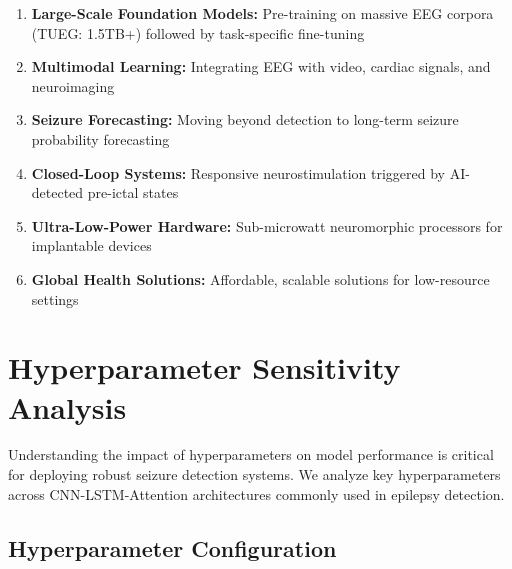 \documentclass[12pt,a4paper]{article}
\begin{document}
\begin{enumerate}
    \item \textbf{Large-Scale Foundation Models:} Pre-training on massive EEG corpora (TUEG: 1.5TB+) followed by task-specific fine-tuning
    \item \textbf{Multimodal Learning:} Integrating EEG with video, cardiac signals, and neuroimaging
    \item \textbf{Seizure Forecasting:} Moving beyond detection to long-term seizure probability forecasting
    \item \textbf{Closed-Loop Systems:} Responsive neurostimulation triggered by AI-detected pre-ictal states
    \item \textbf{Ultra-Low-Power Hardware:} Sub-microwatt neuromorphic processors for implantable devices
    \item \textbf{Global Health Solutions:} Affordable, scalable solutions for low-resource settings
\end{enumerate}

\section{Hyperparameter Sensitivity Analysis}

Understanding the impact of hyperparameters on model performance is critical for deploying robust seizure detection systems. We analyze key hyperparameters across CNN-LSTM-Attention architectures commonly used in epilepsy detection.

\subsection{Hyperparameter Configuration}
\end{document}
